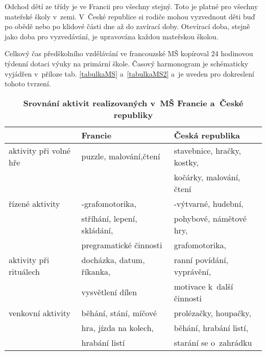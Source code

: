 	Odchod dětí ze třídy je ve Francii pro všechny stejný. Toto je platné pro všechny mateřské školy v~zemi. V~České republice si rodiče mohou vyzvednout děti buď po obědě nebo po klidové části dne až do zavírací doby. Otevírací doba, stejně jako doba pro vyzvedávání, je upravována každou mateřskou školou.

	Celkový čas předškolního vzdělávání ve francouzské MŠ kopíroval 24 hodinovou týdenní dotaci výuky na primární škole. Časový harmonogram je schématicky vyjádřen v~příloze tab. \ref{tabulkaMS} a~\ref{tabulkaMS2} a~je uveden pro dokreslení tohoto tvrzení.


\begin{table}[h]
	\center
	\begin{tabular}{|l|l|l|}
	\hline
	\rowcolor{grey}
								& \textbf{Francie}				& \textbf{Česká republika}	\\
	\hline
	\hline
\rowcolor{grey!10}	 aktivity při volné hře	&puzzle, malování,čtení 	&stavebnice, hračky, kostky,\\ 
\rowcolor{grey!10}	 						&							&kočárky, malování, čtení \\ 
\rowcolor{grey!50}	 řízené aktivity  		&\uv{práce}-grafomotorika, 	&\uv{hra}-výtvarné, hudební, \\ 
\rowcolor{grey!50}	 						&stříhání, lepení, skládání,&pohybové, námětové hry, \\ 
\rowcolor{grey!50}	 						&pregramatické činnosti 	&grafomotorika, \\
\rowcolor{grey!10}	 aktivity při rituálech &docházka, datum, říkanka, 	&ranní povídání, vyprávění,\\ 
\rowcolor{grey!10}	 						&vysvětlení dílen			& motivace k~další činnosti\\ 
\rowcolor{grey!50}   venkovní aktivity 		& běhání, stání, míčové		& prolézačky, houpačky, \\
\rowcolor{grey!50}							&hra, jízda na kolech, 		&běhání, hrabání listí,	\\
\rowcolor{grey!50}							&hrabání listí				&starání se o~zahrádku	\\
	 \hline
	\end{tabular}
	
	\caption{ \textbf{Srovnání aktivit realizovaných v~MŠ Francie a~České republiky}
	}
	\label{srovnaniaktivit}
\end{table}
	
